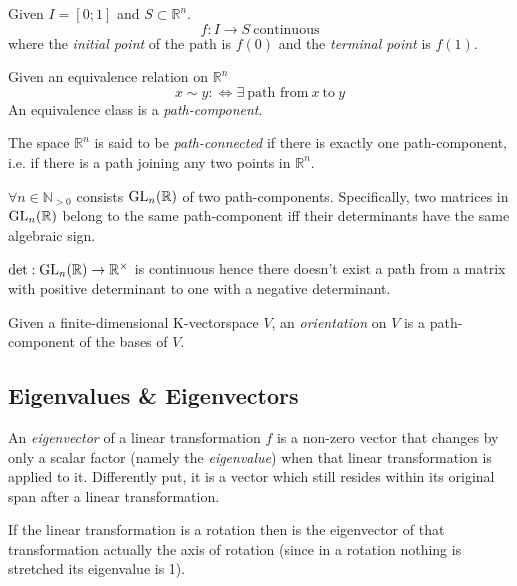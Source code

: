 \begin{definition}[Path]
   Given \(I = [0;1]\) and \(S \subset \mathbb{R}^n\).
   \[f: I \to S~\text{continuous}\]
   where the \textit{initial point} of the path is \(f(0)\) and the \textit{terminal point} is \(f(1)\).
\end{definition}

\begin{definition}
   Given an equivalence relation on \(\mathbb{R}^n\)
   \[x \sim y :\iff \exists~\text{path from}~x~\text{to}~y\]
   An equivalence class is a \textit{path-component}.
\end{definition}
\begin{remark}
   The space \(\mathbb{R}^n\) is said to be \textit{path-connected} if there is exactly one path-component, i.e. if there is a path joining any two points in \(\mathbb{R}^n\).
\end{remark}

\begin{proposition}
   \(\forall n \in \mathbb{N}_{>0}\) consists \(\operatorname{GL}_n(\mathbb{R})\) of two path-components.
   Specifically, two matrices in \(\operatorname{GL}_n(\mathbb{R})\) belong to the same path-component iff their determinants have the same algebraic sign.
\end{proposition}
\begin{remark}
   \(\det: \operatorname{GL}_n(\mathbb{R}) \to \mathbb{R}^\times\) is continuous hence there doesn't exist a path from a matrix with positive determinant to one with a negative determinant.
\end{remark}

\begin{definition}[Orientation]
   Given a finite-dimensional K-vectorspace \(V\), an \emph{orientation} on \(V\) is a path-component of the bases of \(V\).
\end{definition}

\subsection{Eigenvalues \& Eigenvectors}
An \textit{eigenvector} of a linear transformation \(f\) is a non-zero vector that changes by only a scalar factor (namely the \textit{eigenvalue}) when that linear transformation is applied to it.
Differently put, it is a vector which still resides within its original span after a linear transformation.

If the linear transformation is a rotation then is the eigenvector of that transformation actually the axis of rotation (since in a rotation nothing is stretched its eigenvalue is 1).


